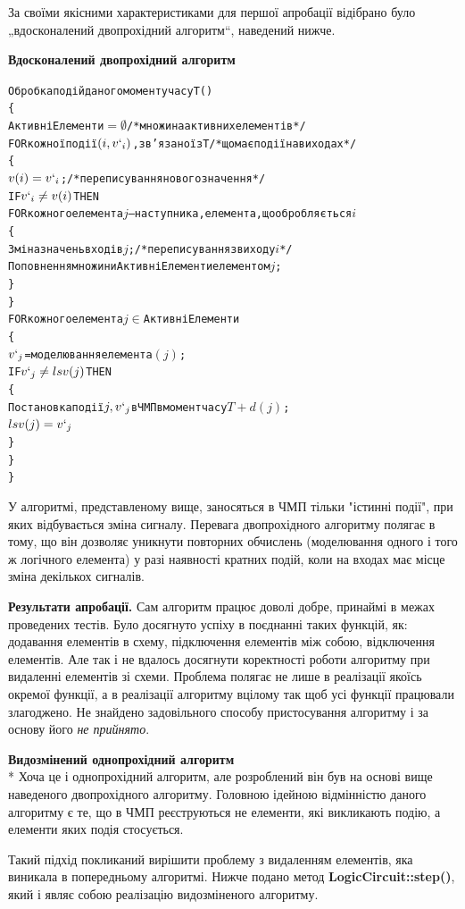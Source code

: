 \documentclass[12pt,a4paper]{article}
\begin{document}
За своїми якісними характеристиками для першої апробації відібрано було „вдосконалений двопрохідний алгоритм“, наведений нижче.

\textbf{Вдосконалений двопрохідний алгоритм}
\small\begin{alltt}
Обробка подій даного моменту часу T()
\{
  АктивніЕлементи \(=\emptyset\) /* множина активних елементів */
  FOR кожної події \((i, v`_i)\), зв’язаної з T /* що має події на виходах */
  \{
    \(v(i) = v`_i\); /* переписування нового значення */
    IF \(v`_i \neq v(i)\) THEN
    FOR кожного елемента \(j\) -- наступника, елемента, що обробляється \(i\)
    \{
      Зміна значень входів \(j\); /* переписування з виходу \(i\)*/
      Поповнення множини АктивніЕлементи елементом \(j\);
    \}
  \}
  FOR кожного елемента \(j\in\) АктивніЕлементи
  \{
    \(v`_j\) = моделювання елемента \((j)\);
    IF \(v`_j \neq lsv(j)\) THEN
    \{
      Постановка події \(j, v`_j\) в ЧМП в момент часу \(T+d(j)\);
      \(lsv(j)=v`_j\)
    \}
  \}
\}
\end{alltt}\normalsize

У алгоритмі, представленому вище, заносяться в ЧМП тільки "істинні події", при яких відбувається зміна сигналу. Перевага двопрохідного алгоритму полягає в тому, що він дозволяє уникнути повторних обчислень (моделювання одного і того ж логічного елемента) у разі наявності кратних подій, коли на входах має місце зміна декількох сигналів.

\textbf{Результати апробації.} Сам алгоритм працює доволі добре, принаймі в межах проведених тестів. Було досягнуто успіху в поєднанні таких функцій, як: додавання елементів в схему, підключення елементів між собою, відключення елементів. Але так і не вдалось досягнути коректності роботи алгоритму при видаленні елементів зі схеми. Проблема полягає не лише в реалізації якоїсь окремої функції, а в реалізації алгоритму вцілому так щоб усі функції працювали злагоджено. Не знайдено задовільного способу пристосування алгоритму і за основу його \emph{не прийнято}.

\textbf{Видозмінений однопрохідний алгоритм}\\*
Хоча це і однопрохідний алгоритм, але розроблений він був на основі вище наведеного двопрохідного алгоритму. Головною ідейною відмінністю даного алгоритму є те, що в ЧМП реєструються не елементи, які викликають подію, а елементи яких подія стосується.

Такий підхід покликаний вирішити проблему з видаленням елементів, яка виникала в попередньому алгоритмі. Нижче подано метод \textbf{LogicCircuit::step()}, який і являє собою реалізацію видозміненого алгоритму.
\end{document}
